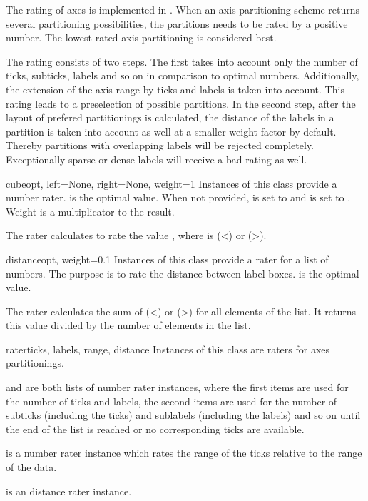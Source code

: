 
The rating of axes is implemented in . When
an axis partitioning scheme returns several partitioning
possibilities, the partitions needs to be rated by a positive number.
The lowest rated axis partitioning is considered best.

The rating consists of two steps. The first takes into account only
the number of ticks, subticks, labels and so on in comparison to
optimal numbers. Additionally, the extension of the axis range by
ticks and labels is taken into account. This rating leads to a
preselection of possible partitions. In the second step, after the
layout of prefered partitionings is calculated, the distance of the
labels in a partition is taken into account as well at a smaller
weight factor by default. Thereby partitions with overlapping labels
will be rejected completely. Exceptionally sparse or dense labels will
receive a bad rating as well.

\begin{classdesc}{cube}{opt, left=None, right=None, weight=1}
  Instances of this class provide a number rater.  is the
  optimal value. When not provided,  is set to  and
   is set to . Weight is a multiplicator
  to the result.

  The rater calculates
   to rate the
  value , where  is 
  (\textless{}) or 
  (\textgreater{}).
\end{classdesc}

\begin{classdesc}{distance}{opt, weight=0.1}
  Instances of this class provide a rater for a list of numbers.
  The purpose is to rate the distance between label boxes. 
  is the optimal value.

  The rater calculates the sum of 
  (\textless{}) or 
  (\textgreater{}) for all elements  of the
  list. It returns this value divided by the number of elements in the
  list.
\end{classdesc}

\begin{classdesc}{rater}{ticks, labels, range, distance}
  Instances of this class are raters for axes partitionings.

   and  are both lists of number rater
  instances, where the first items are used for the number of ticks
  and labels, the second items are used for the number of subticks
  (including the ticks) and sublabels (including the labels) and so on
  until the end of the list is reached or no corresponding ticks are
  available.

   is a number rater instance which rates the range of the
  ticks relative to the range of the data.

   is an distance rater instance.
\end{classdesc}

